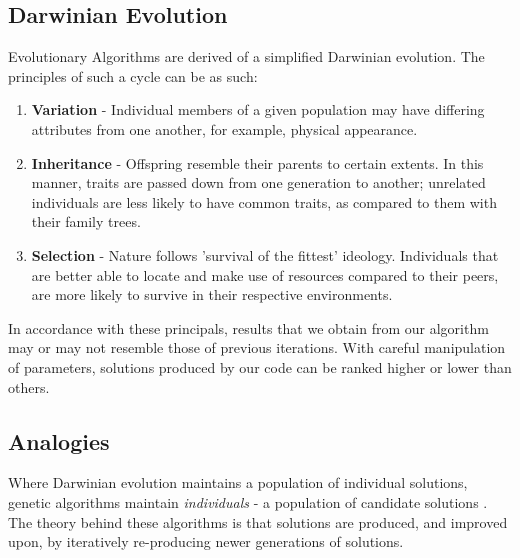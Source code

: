 \documentclass[conference,compsoc]{IEEEtran}
\begin{document}
\subsection{Darwinian Evolution}
Evolutionary Algorithms are derived of a simplified Darwinian evolution. The principles of such a cycle can be as such:
\begin{enumerate}
    \item \textbf{Variation} - Individual members of a given population may have differing attributes 
    from one another, for example, physical appearance.
    \item \textbf{Inheritance} - Offspring resemble their parents to certain extents. 
    In this manner, traits are passed down from one generation to another; unrelated individuals are less likely to have common traits, as 
    compared to them with their family trees.
    \item \textbf{Selection} - Nature follows 'survival of the fittest' ideology. Individuals that 
    are better able to locate and make use of resources compared to their peers, are more likely to survive in their respective environments. 
\end{enumerate}
In accordance with these principals, results that we obtain from our algorithm may or may not resemble those of 
previous iterations. With careful manipulation of parameters, solutions produced by our code can be ranked 
higher or lower than others.
\subsection{Analogies}
Where Darwinian evolution maintains a population of individual solutions, genetic algorithms maintain 
\textit{individuals} - a population of candidate solutions \cite{Wiransky-GA}. The theory behind these 
algorithms is that solutions are produced, and improved upon, by iteratively re-producing newer generations of solutions.
\end{document}
